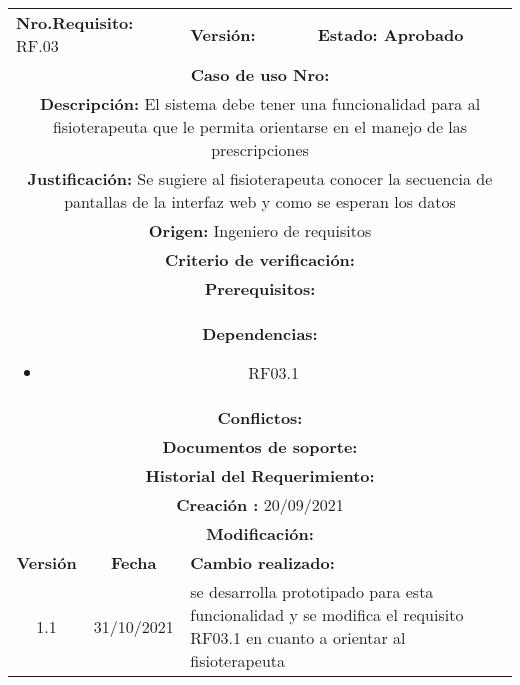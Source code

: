 \begin{center}
         \begin{tabular}{|c|c|p{4cm}|p{4cm}|}
            \hline
            \rowcolor{orange} \multicolumn{4}{|c|}{\textbf{Prioridad:} Media}  \\
            \hline
            \multicolumn{2}{|l}{\textbf{Nro.Requisito: }RF.03} & \multicolumn{1}{l|}{\textbf{Versión: }} & \multicolumn{1}{|l|}{\textbf{Estado: Aprobado}} \\
            \multicolumn{4}{|p{12cm}|}{\textbf{Caso de uso Nro: }}  \\
            \hline
            \multicolumn{4}{|p{13cm}|}{\textbf{Descripción: } El sistema debe tener una funcionalidad para al fisioterapeuta que le permita orientarse en el manejo de las prescripciones}  \\
            \multicolumn{4}{|p{13cm}|}{\textbf{Justificación: }Se sugiere al fisioterapeuta conocer la secuencia de pantallas de la interfaz web y como se esperan los datos}  \\
            \multicolumn{4}{|p{12cm}|}{\textbf{Origen: }Ingeniero de requisitos}  \\
            \multicolumn{4}{|p{13cm}|}{\textbf{Criterio de verificación: }}  \\
            \hline
            \multicolumn{4}{|p{13cm}|}{\textbf{Prerequisitos: }}  \\
            \hline
            \multicolumn{4}{|p{12cm}|}{\textbf{Dependencias: }
                \begin{itemize}
                \item RF03.1
                \end{itemize}}  \\
            \multicolumn{4}{|p{12cm}|}{\textbf{Conflictos: }}  \\
            \hline
            \multicolumn{4}{|p{12cm}|}{\textbf{Documentos de soporte: }}  \\
            \hline
            \multicolumn{4}{|p{12cm}|}{\textbf{Historial del Requerimiento: }}  \\
            \multicolumn{4}{|p{12cm}|}{\textbf{Creación : }20/09/2021}  \\
            \multicolumn{4}{|p{12cm}|}{\textbf{Modificación: }}  \\
             \textbf{Versión} & \textbf{Fecha} & \multicolumn{2}{p{8cm}|}{\textbf{Cambio realizado:}} \\
            \hline
               1.1    &31/10/2021 &   \multicolumn{2}{p{8cm}|}{se desarrolla prototipado para esta funcionalidad y se modifica el requisito RF03.1 en cuanto a orientar al fisioterapeuta}
              \\
            \hline
        \end{tabular}
        

\end{center}

